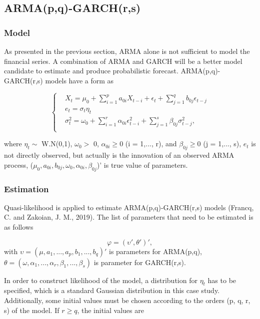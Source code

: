 \documentclass[12pt,a4paper]{article}
\numberwithin{equation}{section}
\begin{document}
 \subsection{ARMA(p,q)-GARCH(r,s)}
 \subsubsection{Model}
 As presented in the previous section, ARMA alone is not sufficient to model the financial series. A combination of ARMA and GARCH will be a better model candidate to estimate and produce probabilistic forecast. ARMA(p,q)-GARCH(r,s) models have a form as 
 
 
 \begin{equation}
 \begin{cases}
 & X_t  = \mu_0 + \sum_{i=1}^{p} a_{0i} X_{t-i}  + \epsilon_t + \sum_{j=1}^{q}b_{0j} \epsilon_{t-j} \\
 & e_t = \sigma_t \eta_t \\
 & \sigma_t^2 = \omega_0 + \sum_{i=1}^{r} \alpha_{0i} \epsilon_{t-i}^2 + \sum_{j=1}^{s}\beta_{0j}\sigma_{t-j}^2, \\
 \end{cases}
 \end{equation}

 where $\eta_t \sim $ W.N(0,1), $\omega_0 >$ 0, $\alpha_{0i} \geq 0$ (i = 1,..., r), and $\beta_{0j} \geq 0$ (j = 1,..., s), $e_t$ is not directly observed, but actually is the innovation of an observed ARMA process, ($\mu_0 , a_{0i}, b_{0j}, \omega_0, \alpha_{0i}, \beta_{0j}$)' is true value of parameters.
 
\subsubsection{Estimation}
Quasi-likelihood is applied to estimate ARMA(p,q)-GARCH(r,s) models (Francq, C. and Zakoian, J. M., 2019). The list of parameters that need to be estimated is as follows

\[\varphi = (\upsilon', \theta')',\]
with $\upsilon = (\mu, a_{1}, ..., a_p, b_1, ..., b_q)'$ is parameters for ARMA(p,q), $\theta = (\omega, \alpha_1, ..., \alpha_r, \beta_1, ..., \beta_s)$ is parameter for GARCH(r,s).

In order to construct likelihood of the model, a distribution for $\eta_t$ has to be specified, which is a standard Gaussian distribution in this case study. Additionally, some initial values must be chosen according to the orders (p, q, r, s) of the model.
If $r \geq q$, the initial values are 
\end{document}
